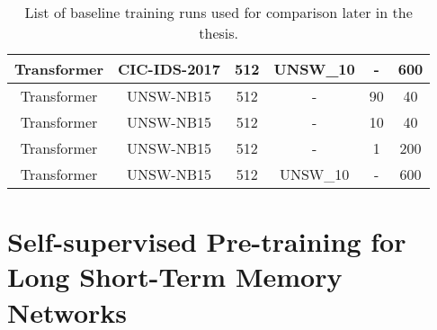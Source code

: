 \begin{table}[h]
{\begin{tabular}{c c c c c c}
			Transformer    & CIC-IDS-2017     & 512                                     & UNSW\_10	& -                    & 600                                           \\ \midrule
			Transformer    & UNSW-NB15        & 512                                     & -			& 90                   & 40                                            \\ \midrule
			Transformer    & UNSW-NB15        & 512                                     & -			& 10                   & 40                                            \\ \midrule
			Transformer    & UNSW-NB15        & 512                                     & -			& 1                    & 200                                           \\ \midrule
			Transformer    & UNSW-NB15        & 512                                     & UNSW\_10	& -                    & 600                                           \\
	\end{tabular}}
	\caption{List of baseline training runs used for comparison later in the thesis.}
	\label{table:experiments:baseline}
\end{table}

\section{Self-supervised Pre-training for Long Short-Term Memory Networks} \label{sec:experiments_lstm}

